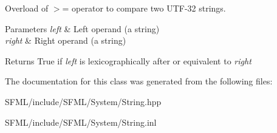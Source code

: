 Overload of $>$= operator to compare two U\+T\+F-\/32 strings. 


\begin{DoxyParams}{Parameters}
{\em left} & Left operand (a string) \\
\hline
{\em right} & Right operand (a string)\\
\hline
\end{DoxyParams}
\begin{DoxyReturn}{Returns}
True if {\itshape left} is lexicographically after or equivalent to {\itshape right} \begin{DoxyVerb}\end{DoxyVerb}
 
\end{DoxyReturn}


The documentation for this class was generated from the following files\+:\begin{DoxyCompactItemize}
\item 
S\+F\+M\+L/include/\+S\+F\+M\+L/\+System/String.\+hpp\item 
S\+F\+M\+L/include/\+S\+F\+M\+L/\+System/String.\+inl\end{DoxyCompactItemize}
